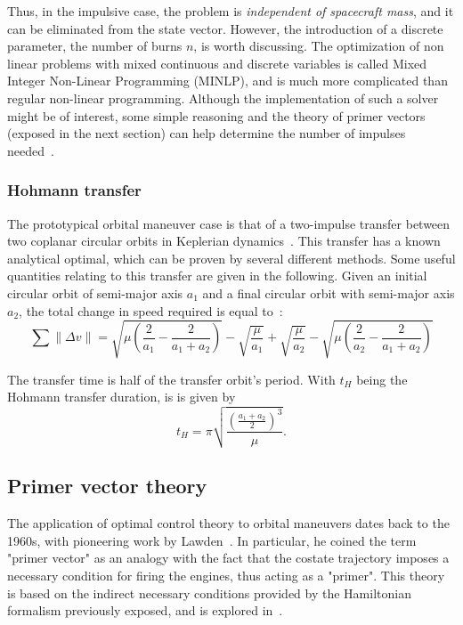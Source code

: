 Thus, in the impulsive case, the problem is \textit{independent of spacecraft mass}, and it can be eliminated from the state vector. However, the introduction of a discrete parameter, the number of burns \(n\), is worth discussing. The optimization of non linear problems with mixed continuous and discrete variables is called Mixed Integer Non-Linear Programming (MINLP), and is much more complicated than regular non-linear programming. Although the implementation of such a solver might be of interest, some simple reasoning and the theory of primer vectors (exposed in the next section) can help determine the number of impulses needed~\cite{interactive_primer_vector}.

\subsubsection{Hohmann transfer}

The prototypical orbital maneuver case is that of a two-impulse transfer between two coplanar circular orbits in Keplerian dynamics~\cite{chobotov}. This transfer has a known analytical optimal, which can be proven by several different methods. Some useful quantities relating to this transfer are given in the following. Given an initial circular orbit of semi-major axis \(a_1\) and a final circular orbit with semi-major axis \(a_2\), the total change in speed required is equal to~\cite{chobotov}:
\begin{equation}\label{eq:hohmann_deltav}
    \sum \lVert \Delta v \rVert = \sqrt{\mu\left(\frac{2}{a_1}-\frac{2}{a_1+a_2}\right)} - \sqrt{\frac{\mu}{a_1}} + \sqrt{\frac{\mu}{a_2}} - \sqrt{\mu\left(\frac{2}{a_2}-\frac{2}{a_1+a_2}\right)}
\end{equation}

The transfer time is half of the transfer orbit's period. With \(t_H\) being the Hohmann transfer duration, is is given by~\cite{chobotov} 
\begin{equation}\label{eq:hohmann_time}
    t_H = \pi \sqrt{\frac{\left(\frac{a_1+a_2}{2}\right)^3}{\mu}}.
\end{equation}

\subsection{Primer vector theory}

The application of optimal control theory to orbital maneuvers dates back to the 1960s, with pioneering work by Lawden~\cite{Conway_2010}. In particular, he coined the term "primer vector"  as an analogy with the fact that the costate trajectory imposes a necessary condition for firing the engines, thus acting as a "primer". This theory is based on the indirect necessary conditions provided by the Hamiltonian formalism previously exposed, and is explored in~\cite{Conway_2010}.

